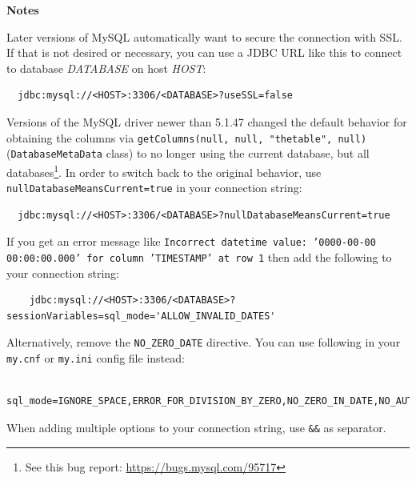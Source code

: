 \noindent \textbf{Notes}
\begin{tight_itemize}
  \item Later versions of MySQL automatically want to secure
  the connection with SSL. If that is not desired or necessary, you can use
  a JDBC URL like this to connect to database \textit{DATABASE} on host \textit{HOST}:
  \begin{verbatim}
  jdbc:mysql://<HOST>:3306/<DATABASE>?useSSL=false
  \end{verbatim}

  \item Versions of the MySQL driver newer than 5.1.47 changed the default
  behavior for obtaining the columns via \verb|getColumns(null, null, "thetable", null)|
  (\verb|DatabaseMetaData| class) to no longer using the current database, but
  all databases\footnote{See this bug report: \url{https://bugs.mysql.com/95717}{}}.
  In order to switch back to the original behavior, use \verb|nullDatabaseMeansCurrent=true|
  in your connection string:
  \begin{verbatim}
  jdbc:mysql://<HOST>:3306/<DATABASE>?nullDatabaseMeansCurrent=true
  \end{verbatim}

  \item If you get an error message like \texttt{Incorrect datetime value: '0000-00-00 00:00:00.000' for column 'TIMESTAMP' at row 1}
  then add the following to your connection string:
  \begin{verbatim}
    jdbc:mysql://<HOST>:3306/<DATABASE>?sessionVariables=sql_mode='ALLOW_INVALID_DATES'
  \end{verbatim}
  Alternatively, remove the \texttt{NO\_ZERO\_DATE} directive. You can use following
  in your \texttt{my.cnf} or \texttt{my.ini} config file instead:
  {\scriptsize
    \begin{verbatim}
      sql_mode=IGNORE_SPACE,ERROR_FOR_DIVISION_BY_ZERO,NO_ZERO_IN_DATE,NO_AUTO_CREATE_USER,NO_ENGINE_SUBSTITUTION
    \end{verbatim}}

  \item When adding multiple options to your connection string, use \verb|&&| as separator.
\end{tight_itemize}


\newpage
